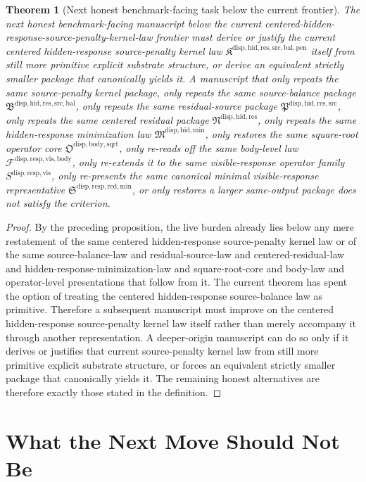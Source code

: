 \documentclass[11pt]{article}
\newcommand{\SourcePenaltyKernelLawPackage}{\mathfrak K^{\mathrm{disp,hid,res,src,bal,pen}}}
\newcommand{\SourceBalanceLawPackage}{\mathfrak B^{\mathrm{disp,hid,res,src,bal}}}
\newcommand{\ResidualSourceLawPackage}{\mathfrak P^{\mathrm{disp,hid,res,src}}}
\newcommand{\ResidualLawPackage}{\mathfrak N^{\mathrm{disp,hid,res}}}
\newcommand{\HiddenMinimizationPackage}{\mathfrak M^{\mathrm{disp,hid,min}}}
\newcommand{\SquareRootOperatorCore}{\mathfrak O^{\mathrm{disp,body,sqrt}}}
\newcommand{\VisibleBodyForcingLaw}{\mathscr F^{\mathrm{disp,resp,vis,body}}}
\newcommand{\VisibleResponseOperator}{S^{\mathrm{disp,resp,vis}}}
\newcommand{\MinimalReducedStructure}{\mathfrak S^{\mathrm{disp,resp,red,min}}}
\newtheorem{theorem}{Theorem}
\begin{document}
\begin{theorem}[Next honest benchmark-facing task below the current frontier]
The next honest benchmark-facing manuscript below the current centered-hidden-response-source-penalty-kernel-law frontier must derive or justify the current centered hidden-response source-penalty kernel law \(\SourcePenaltyKernelLawPackage\) itself from still more primitive explicit substrate structure, or derive an equivalent strictly smaller package that canonically yields it. A manuscript that only repeats the same source-penalty kernel package, only repeats the same source-balance package \(\SourceBalanceLawPackage\), only repeats the same residual-source package \(\ResidualSourceLawPackage\), only repeats the same centered residual package \(\ResidualLawPackage\), only repeats the same hidden-response minimization law \(\HiddenMinimizationPackage\), only restores the same square-root operator core \(\SquareRootOperatorCore\), only re-reads off the same body-level law \(\VisibleBodyForcingLaw\), only re-extends it to the same visible-response operator family \(\VisibleResponseOperator\), only re-presents the same canonical minimal visible-response representative \(\MinimalReducedStructure\), or only restores a larger same-output package does not satisfy the criterion.
\end{theorem}

\begin{proof}
By the preceding proposition, the live burden already lies below any mere restatement of the same centered hidden-response source-penalty kernel law or of the same source-balance-law and residual-source-law and centered-residual-law and hidden-response-minimization-law and square-root-core and body-law and operator-level presentations that follow from it. The current theorem has spent the option of treating the centered hidden-response source-balance law as primitive. Therefore a subsequent manuscript must improve on the centered hidden-response source-penalty kernel law itself rather than merely accompany it through another representation. A deeper-origin manuscript can do so only if it derives or justifies that current source-penalty kernel law from still more primitive explicit substrate structure, or forces an equivalent strictly smaller package that canonically yields it. The remaining honest alternatives are therefore exactly those stated in the definition.
\end{proof}

\section{What the Next Move Should Not Be}
\end{document}
